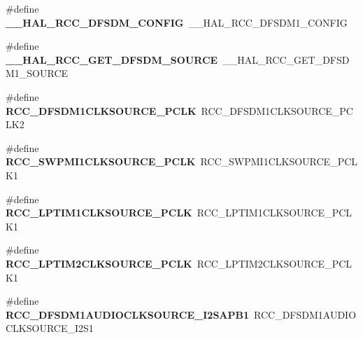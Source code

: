 \begin{DoxyCompactItemize}
\#define {\bfseries \+\_\+\+\_\+\+H\+A\+L\+\_\+\+R\+C\+C\+\_\+\+D\+F\+S\+D\+M\+\_\+\+C\+O\+N\+F\+IG}~\+\_\+\+\_\+\+H\+A\+L\+\_\+\+R\+C\+C\+\_\+\+D\+F\+S\+D\+M1\+\_\+\+C\+O\+N\+F\+IG
\item 
\mbox{\label{group___h_a_l___r_c_c___aliased_gad4a161eff1e0026f34cee8c33eff569b}} 
\#define {\bfseries \+\_\+\+\_\+\+H\+A\+L\+\_\+\+R\+C\+C\+\_\+\+G\+E\+T\+\_\+\+D\+F\+S\+D\+M\+\_\+\+S\+O\+U\+R\+CE}~\+\_\+\+\_\+\+H\+A\+L\+\_\+\+R\+C\+C\+\_\+\+G\+E\+T\+\_\+\+D\+F\+S\+D\+M1\+\_\+\+S\+O\+U\+R\+CE
\item 
\mbox{\label{group___h_a_l___r_c_c___aliased_ga955619c85104217f8403b5efdff9e3e6}} 
\#define {\bfseries R\+C\+C\+\_\+\+D\+F\+S\+D\+M1\+C\+L\+K\+S\+O\+U\+R\+C\+E\+\_\+\+P\+C\+LK}~R\+C\+C\+\_\+\+D\+F\+S\+D\+M1\+C\+L\+K\+S\+O\+U\+R\+C\+E\+\_\+\+P\+C\+L\+K2
\item 
\mbox{\label{group___h_a_l___r_c_c___aliased_ga0e9ef1db423c75e06fc65b7d0fce9b43}} 
\#define {\bfseries R\+C\+C\+\_\+\+S\+W\+P\+M\+I1\+C\+L\+K\+S\+O\+U\+R\+C\+E\+\_\+\+P\+C\+LK}~R\+C\+C\+\_\+\+S\+W\+P\+M\+I1\+C\+L\+K\+S\+O\+U\+R\+C\+E\+\_\+\+P\+C\+L\+K1
\item 
\mbox{\label{group___h_a_l___r_c_c___aliased_ga7c3c0ccdb79bafc7b079c70896bd1cb9}} 
\#define {\bfseries R\+C\+C\+\_\+\+L\+P\+T\+I\+M1\+C\+L\+K\+S\+O\+U\+R\+C\+E\+\_\+\+P\+C\+LK}~R\+C\+C\+\_\+\+L\+P\+T\+I\+M1\+C\+L\+K\+S\+O\+U\+R\+C\+E\+\_\+\+P\+C\+L\+K1
\item 
\mbox{\label{group___h_a_l___r_c_c___aliased_gaf782a8b81a037ca2c00107a3f311a9de}} 
\#define {\bfseries R\+C\+C\+\_\+\+L\+P\+T\+I\+M2\+C\+L\+K\+S\+O\+U\+R\+C\+E\+\_\+\+P\+C\+LK}~R\+C\+C\+\_\+\+L\+P\+T\+I\+M2\+C\+L\+K\+S\+O\+U\+R\+C\+E\+\_\+\+P\+C\+L\+K1
\item 
\mbox{\label{group___h_a_l___r_c_c___aliased_ga185a74951bfdcbac7413461f38001f2c}} 
\#define {\bfseries R\+C\+C\+\_\+\+D\+F\+S\+D\+M1\+A\+U\+D\+I\+O\+C\+L\+K\+S\+O\+U\+R\+C\+E\+\_\+\+I2\+S\+A\+P\+B1}~R\+C\+C\+\_\+\+D\+F\+S\+D\+M1\+A\+U\+D\+I\+O\+C\+L\+K\+S\+O\+U\+R\+C\+E\+\_\+\+I2\+S1
\item 
\mbox{\label{group___h_a_l___r_c_c___aliased_gaa9c8dabc3531ee6ed8bd93f92cb1a2b7}} 

\end{DoxyCompactItemize}
